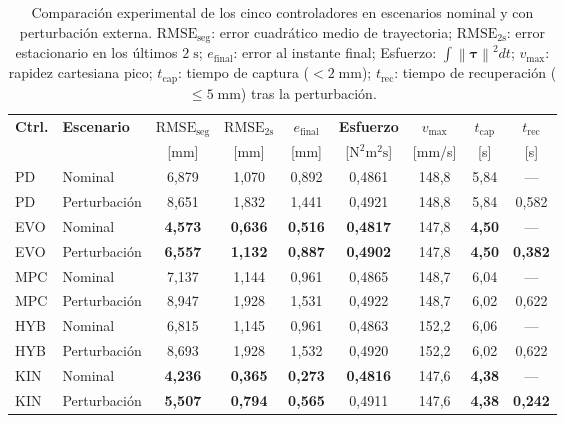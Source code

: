 \documentclass[11pt,a4paper]{article}
\newcommand{\norm}[1]{\left\lVert#1\right\rVert}
\begin{document}
\begin{table}[htbp]
\centering
\caption{Comparación experimental de los cinco controladores en escenarios nominal y con perturbación externa. $\text{RMSE}_{\text{seg}}$: error cuadrático medio de trayectoria; $\text{RMSE}_{2\text{s}}$: error estacionario en los últimos $2\;\text{s}$; $e_{\text{final}}$: error al instante final; Esfuerzo: $\int\norm{\bm{\tau}}^{2}dt$; $v_{\max}$: rapidez cartesiana pico; $t_{\text{cap}}$: tiempo de captura ($<2\;\text{mm}$); $t_{\text{rec}}$: tiempo de recuperación ($\le 5\;\text{mm}$) tras la perturbación.}\label{tab:resultados}
\footnotesize
\setlength{\tabcolsep}{4.2pt}
\begin{tabular}{llccccccc}
\toprule
\textbf{Ctrl.} & \textbf{Escenario} & $\text{RMSE}_{\text{seg}}$ & $\text{RMSE}_{2\text{s}}$ & $e_{\text{final}}$ & \textbf{Esfuerzo} & $v_{\max}$ & $t_{\text{cap}}$ & $t_{\text{rec}}$ \\
 & & {[mm]} & {[mm]} & {[mm]} & {[$\text{N}^{2}\text{m}^{2}\text{s}$]} & {[mm/s]} & {[s]} & {[s]} \\
\midrule
PD  & Nominal      & 6{,}879 & 1{,}070 & 0{,}892 & 0{,}4861 & 148{,}8 & 5{,}84 & --- \\
PD  & Perturbación & 8{,}651 & 1{,}832 & 1{,}441 & 0{,}4921 & 148{,}8 & 5{,}84 & 0{,}582 \\
\midrule
EVO & Nominal      & \textbf{4{,}573} & \textbf{0{,}636} & \textbf{0{,}516} & \textbf{0{,}4817} & 147{,}8 & \textbf{4{,}50} & --- \\
EVO & Perturbación & \textbf{6{,}557} & \textbf{1{,}132} & \textbf{0{,}887} & \textbf{0{,}4902} & 147{,}8 & \textbf{4{,}50} & \textbf{0{,}382} \\
\midrule
MPC & Nominal      & 7{,}137 & 1{,}144 & 0{,}961 & 0{,}4865 & 148{,}7 & 6{,}04 & --- \\
MPC & Perturbación & 8{,}947 & 1{,}928 & 1{,}531 & 0{,}4922 & 148{,}7 & 6{,}02 & 0{,}622 \\
\midrule
HYB & Nominal      & 6{,}815 & 1{,}145 & 0{,}961 & 0{,}4863 & 152{,}2 & 6{,}06 & --- \\
HYB & Perturbación & 8{,}693 & 1{,}928 & 1{,}532 & 0{,}4920 & 152{,}2 & 6{,}02 & 0{,}622 \\
\midrule
KIN & Nominal      & \textbf{4{,}236} & \textbf{0{,}365} & \textbf{0{,}273} & \textbf{0{,}4816} & 147{,}6 & \textbf{4{,}38} & --- \\
KIN & Perturbación & \textbf{5{,}507} & \textbf{0{,}794} & \textbf{0{,}565} & 0{,}4911 & 147{,}6 & \textbf{4{,}38} & \textbf{0{,}242} \\
\bottomrule
\end{tabular}
\end{table}
\end{document}
